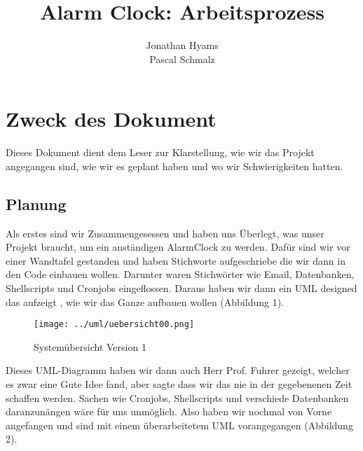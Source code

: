 \documentclass[11pt,titelpage]{scrartcl}
\title{Alarm Clock: Arbeitsprozess }
\author{Jonathan Hyams \\Pascal Schmalz}
\begin{document}
\thispagestyle{empty}
\maketitle
\pagebreak
\tableofcontents

\pagestyle{fancy}


\begin{abstract}
\end{abstract}
\pagebreak


\section{Zweck des Dokument}
Dieses Dokument dient dem Leser zur Klarstellung, wie wir das Projekt angegangen sind, wie wir es geplant haben und wo wir Schwierigkeiten hatten.
\subsection{Planung}
Als erstes sind wir Zusammengesessen und haben uns Überlegt, was unser Projekt braucht, um ein anständigen AlarmClock zu werden. Dafür sind wir
vor einer Wandtafel gestanden und haben Stichworte aufgeschriebe die wir dann in den Code einbauen wollen. Darunter waren Stichwörter wie
Email, Datenbanken, Shellscripts und Cronjobs eingeflossen. Daraus haben wir dann ein UML designed das aufzeigt , wie wir das Ganze aufbauen wollen (Abbildung 1).
\begin{landscape}
\begin{figure}
  \centering
    \texttt{[image: ../uml/uebersicht00.png]}
  \caption{Systemübersicht Version 1}
  \label{fig:overview}
\end{figure}
\end{landscape}
Dieses UML-Diagramm haben wir dann auch Herr Prof. Fuhrer gezeigt, welcher es zwar eine Gute Idee fand, aber sagte dass wir das nie in der gegebenenen
Zeit schaffen werden. Sachen wie Cronjobs, Shellscripts und verschiede Datenbanken daranzunängen wäre für uns unmöglich.
Also haben wir nochmal von Vorne angefangen und sind mit einem überarbeitetem UML vorangegangen (Abbildung 2).
\end{document}
